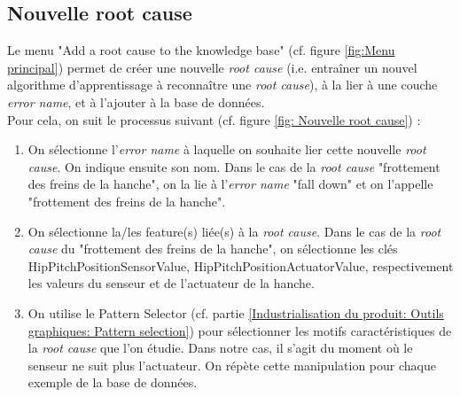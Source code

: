 \subsection{Nouvelle root cause}
\label{Industrialisation du produit: Utilisation suggérée des outils: Nouvelle root cause}
Le menu "Add a root cause to the knowledge base" (cf. figure \ref{fig:Menu principal}) permet de créer une nouvelle \emph{root cause} (i.e. entraîner un nouvel algorithme d'apprentissage à reconnaître une \emph{root cause}), à la lier à une couche \emph{error name}, et à l'ajouter à la base de données. \\
Pour cela, on suit le processus suivant (cf. figure \ref{fig: Nouvelle root cause}) : 
\begin{enumerate}
	\item On sélectionne l'\emph{error name} à laquelle on souhaite lier cette nouvelle \emph{root cause}. On indique ensuite son nom. Dans le cas de la \emph{root cause} "frottement des freins de la hanche", on la lie à l'\emph{error name} "fall down" et on l'appelle "frottement des freins de la hanche". 
	\item On sélectionne la/les feature(s) liée(s) à la \emph{root cause}. Dans le cas de la \emph{root cause} du "frottement des freins de la hanche", on sélectionne les clés HipPitchPositionSensorValue, HipPitchPositionActuatorValue, respectivement les valeurs du senseur et de l'actuateur de la hanche. 
	\item On utilise le Pattern Selector (cf. partie \ref{Industrialisation du produit: Outils graphiques: Pattern selection}) pour sélectionner les motifs caractéristiques de la \emph{root cause} que l'on étudie. Dans notre cas, il s'agit du moment où le senseur ne suit plus l'actuateur. On répète cette manipulation pour chaque exemple de la base de données.
\end{enumerate}

